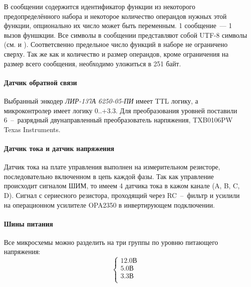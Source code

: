В сообщении содержится идентификатор функции из некоторого предопределённого
набора и некоторое количество операндов нужных этой функции, опционально их
число может быть переменным.
1 сообщение~--- 1 вызов фуншкции.
Все символы в сообщении представляют собой UTF-8 символы
(см. \cite{ISO_IEC_10646_2012} и \cite{rfc3629}). Соответсвенно предельное число
функций в наборе не ограничено сверху. Так же как и количество и размер
операндов, кроме ограничения на размер всего сообщения, необходимо уложиться в
251 байт.

\paragraph{Датчик обратной связи}
Выбранный энкодер \textit{ЛИР-137А 6250-05-ПИ} имеет TTL логику, а
микроконтролер имеет логику 0..+3.3. Для преобразования уровней поставили
6~--~разрядный двунаправленный преобразователь нарпяжения,
TXB0106PW Texas Instruments.

\paragraph{Датчик тока и датчик напряжения}
Датчик тока на плате управления выполнен на измерительном резисторе,
последовательно включенном в цепь каждой фазы. Так как управление происходит
сигналом ШИМ, то имеем 4 датчика тока в кажом канале (A, B, C, D).
Сигнал с сериесного резистора, проходящий через RC~--~фильтр и усилили на
операционном усилителе OPA2350 в инвертирующем подключении.

\paragraph{Шины питания}
Все микросхемы можно разделить на три группы по уровню питающего напряжения:
$$
    \left\{
    \begin{aligned}
        12.0 \text{В} \\
        5.0  \text{В} \\
        3.3  \text{В} \\
    \end{aligned}
    \right.
$$

